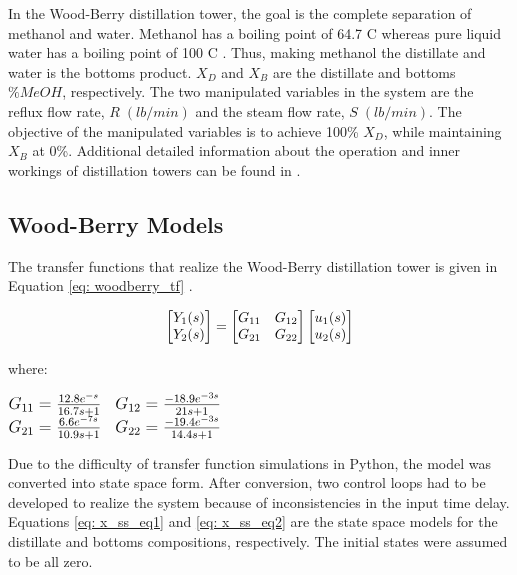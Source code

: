 In the Wood-Berry distillation tower, the goal is the complete separation of methanol and water.  Methanol has a boiling point of 64.7 \textdegree C whereas pure liquid water has a boiling point of 100 \textdegree C \cite{sonntag_thermo}. Thus, making methanol the distillate and water is the bottoms product. $X_D$ and $X_B$ are the distillate and bottoms $\%MeOH$, respectively. The two manipulated variables in the system are the reflux flow rate, $R \; (lb/min)$ and the steam flow rate, $S \; (lb/min)$.  The objective of the manipulated variables is to achieve 100\% $X_D$, while maintaining $X_B$ at 0\%. Additional detailed information about the operation and inner workings of distillation towers can be found in \cite{henry_distillation}.  

\subsection{Wood-Berry Models}
The transfer functions that realize  the Wood-Berry distillation tower is given in Equation \ref{eq: woodberry_tf} \cite{mpc_for_distillation_tower}.

\begin{equation}
    \centering
    \begin{bmatrix}
        Y_1(s) \\
        Y_2(s) 
    \end{bmatrix}
    =
    \begin{bmatrix}
        G_{11}  & G_{12} \\
        G_{21}  & G_{22}
    \end{bmatrix}
    \begin{bmatrix}
        u_1(s) \\
        u_2(s)
    \end{bmatrix}
    \label{eq: woodberry_tf}
\end{equation}

where: \\
\begin{center}
    $
    \large
    \begin{matrix}
        G_{11} = \frac{12.8e^{-s}}{16.7s + 1}     &     G_{12} = \frac{-18.9e^{-3s}}{21s + 1} \\
        G_{21} = \frac{6.6e^{-7s}}{10.9s + 1}     &     G_{22} = \frac{-19.4e^{-3s}}{14.4s + 1}
    \end{matrix}
    $
\end{center}

Due to the difficulty of transfer function simulations in Python, the model was converted into state space form.  After conversion, two control loops had to be developed to realize the system because of inconsistencies in the input time delay.  Equations \ref{eq: x_ss_eq1} and \ref{eq: x_ss_eq2} are the state space models for the distillate and bottoms compositions, respectively.  The initial states were assumed to be all zero.

